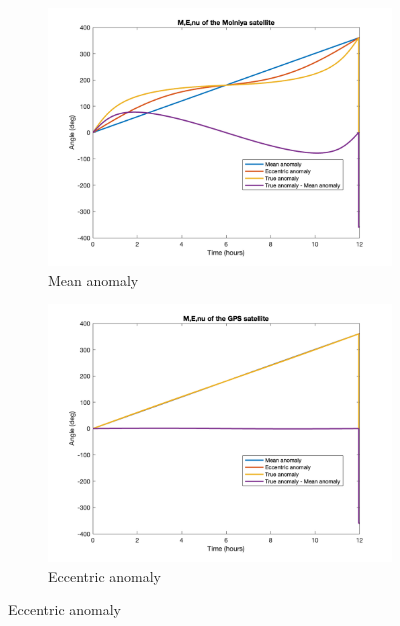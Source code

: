 \documentclass[12pt
,headinclude
,headsepline
,bibtotocnumbered
]{scrartcl}
\begin{document}
\begin{figure}[H]
    \centering
    \begin{subfigure}[b]{0.45\textwidth}
    \includegraphics[width=\textwidth]{plots/MM.png}
    \caption{Mean anomaly}
    \label{fig:M}
    \end{subfigure}
    \begin{subfigure}[b]{0.45\textwidth}
    \includegraphics[width=\textwidth]{plots/MG.png}
    \caption{Eccentric anomaly}
    \label{fig:E}
    \end{subfigure}
\end{figure}
\end{document}
